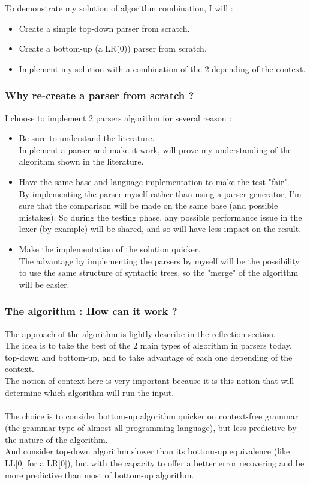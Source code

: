 To demonstrate my solution of algorithm combination, I will :
\begin{itemize}
\item Create a simple top-down parser from scratch.
\item Create a bottom-up (a LR(0)) parser from scratch.
\item Implement my solution with a combination of the 2 depending of the context.
\end{itemize}

\subsubsection{Why re-create a parser from scratch ?}
I choose to implement 2 parsers algorithm for several reason :
\begin{itemize}
\item Be sure to understand the literature.\\
Implement a parser and make it work, will prove my understanding of the algorithm shown in the literature.
\item Have the same base and language implementation to make the test "fair".\\
By implementing the parser myself rather than using a parser generator, I'm sure that the comparison will be made on the same base (and possible mistakes). So during the testing phase, any possible performance issue in the lexer (by example) will be shared, and so will have less impact on the result.
\item Make the implementation of the solution quicker.\\
The advantage by implementing the parsers by myself will be the possibility to use the same structure of syntactic trees, so the "merge" of the algorithm will be easier.
\end{itemize}

\subsubsection{The algorithm : How can it work ?}
The approach of the algorithm is lightly describe in the reflection section.\\
The idea is to take the best of the 2 main types of algorithm in parsers today, top-down and bottom-up, and to take advantage of each one depending of the context.\\
The notion of context here is very important because it is this notion that will determine which algorithm will run the input.\\
\\
The choice is to consider bottom-up algorithm quicker on context-free grammar (the grammar type of almost all programming language), but less predictive by the nature of the algorithm.\\
And consider top-down algorithm slower than its bottom-up equivalence (like LL[0] for a LR[0]), but with the capacity to offer a better error recovering and be more predictive than most of bottom-up algorithm.
